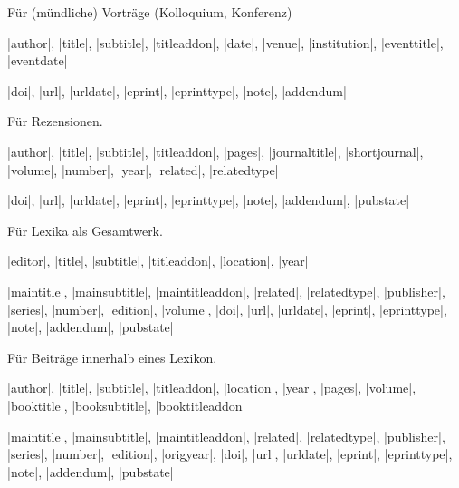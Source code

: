 \documentclass[a4paper,10pt,ngerman]{ltxdoc}
\begin{document}

 
  Für (mündliche) Vorträge (Kolloquium, Konferenz) 
\begin{description}[topsep=0pt]
\item[Notwendig:]  |author|, |title|, |subtitle|, |titleaddon|, |date|, |venue|, |institution|, |eventtitle|, |eventdate|
\item[Optional:] |doi|, |url|, |urldate|, |eprint|, |eprinttype|, |note|, |addendum| 
\end{description}



 Für Rezensionen.
\begin{description}[topsep=0pt]
\item[Notwendig:] |author|, |title|, |subtitle|, |titleaddon|, |pages|, |journaltitle|, |shortjournal|, |volume|, |number|, |year|, |related|, |relatedtype|
\item[Optional:] |doi|, |url|, |urldate|, |eprint|, |eprinttype|, |note|, |addendum|, |pubstate|
\end{description}



  Für Lexika als Gesamtwerk.
\begin{description}[topsep=0pt]
\item[Notwendig:] |editor|, |title|, |subtitle|, |titleaddon|, |location|, |year|
\item[Optional:] |maintitle|, |mainsubtitle|, |maintitleaddon|, |related|, |relatedtype|,
|publisher|, |series|, |number|, |edition|, |volume|, |doi|, |url|, |urldate|, |eprint|, |eprinttype|, |note|, |addendum|, |pubstate|
\end{description}



  Für Beiträge innerhalb eines Lexikon.
\begin{description}[topsep=0pt]
\item[Notwendig:] |author|, |title|, |subtitle|, |titleaddon|, |location|, |year|, |pages|, |volume|, |booktitle|, |booksubtitle|, |booktitleaddon|
\item[Optional:] |maintitle|, |mainsubtitle|, |maintitleaddon|, |related|, |relatedtype|,
|publisher|, |series|, |number|, |edition|, |origyear|, |doi|, |url|, |urldate|, |eprint|, |eprinttype|, |note|, |addendum|, |pubstate|
\end{description}
\end{document}
